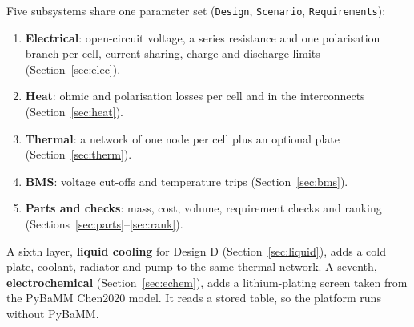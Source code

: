 \documentclass[11pt,a4paper]{article}
\begin{document}
Five subsystems share one parameter set (\texttt{Design}, \texttt{Scenario}, \texttt{Requirements}):
\begin{enumerate}
\item \textbf{Electrical}: open-circuit voltage, a series resistance and one polarisation branch per cell, current sharing, charge and discharge limits (Section~\ref{sec:elec}).
\item \textbf{Heat}: ohmic and polarisation losses per cell and in the interconnects (Section~\ref{sec:heat}).
\item \textbf{Thermal}: a network of one node per cell plus an optional plate (Section~\ref{sec:therm}).
\item \textbf{BMS}: voltage cut-offs and temperature trips (Section~\ref{sec:bms}).
\item \textbf{Parts and checks}: mass, cost, volume, requirement checks and ranking (Sections~\ref{sec:parts}--\ref{sec:rank}).
\end{enumerate}
A sixth layer, \textbf{liquid cooling} for Design D (Section~\ref{sec:liquid}), adds a cold plate, coolant, radiator and pump to the same thermal network. A seventh, \textbf{electrochemical} (Section~\ref{sec:echem}), adds a lithium-plating screen taken from the PyBaMM Chen2020 model. It reads a stored table, so the platform runs without PyBaMM.

\end{document}
